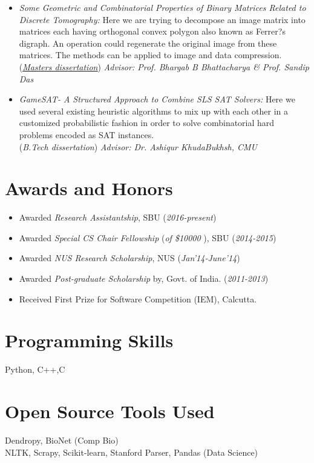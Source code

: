 \documentclass{res}
\begin{document}
\begin{resume}
\begin{itemize}
 \item {{\it Some Geometric and Combinatorial Properties of Binary Matrices Related to
Discrete Tomography:}} Here we are trying to decompose an image matrix into matrices
each having orthogonal convex polygon also known as Ferrer?s digraph. An operation could
regenerate the original image from these matrices. The methods can be applied to image and
data compression. (\href{https://drive.google.com/open?id=0B3ErYrn4jOcxSHhReVF6cmROelE}{\it  \underline{Masters dissertation}}) 
{\it Advisor: Prof. Bhargab B Bhattacharya \& Prof. Sandip Das}

 \item 
 {{\it GameSAT- A Structured Approach to Combine SLS SAT Solvers:}} Here we used several existing heuristic algorithms to mix up with each other in a customized probabilistic fashion in order to solve combinatorial hard problems encoded as SAT instances. \\
({\it B.Tech dissertation}) {\it Advisor: Dr. Ashiqur KhudaBukhsh, CMU}
 
 \end{itemize}
 
 
\section{Awards and Honors}
   \begin{itemize}
   \item Awarded {\it Research Assistantship}, SBU ({\it 2016-present})
   \item Awarded {\it Special CS Chair Fellowship} ({\it of \$10000} ), SBU ({\it 2014-2015})
   \item Awarded {\it NUS Research Scholarship}, NUS ({\it Jan'14-June'14})
   \item Awarded {\it Post-graduate Scholarship} by, Govt. of India. ({\it 2011-2013}) 
   \item Received {\color{blue} First Prize} for Software Competition (IEM), Calcutta.
   \end{itemize}

\section{Programming Skills}
Python, C++,C

\section{\bf Open Source Tools Used}
Dendropy, BioNet  (Comp Bio) \\
NLTK, Scrapy, Scikit-learn, Stanford Parser, Pandas (Data Science) \\




\end{resume}
\end{document}
